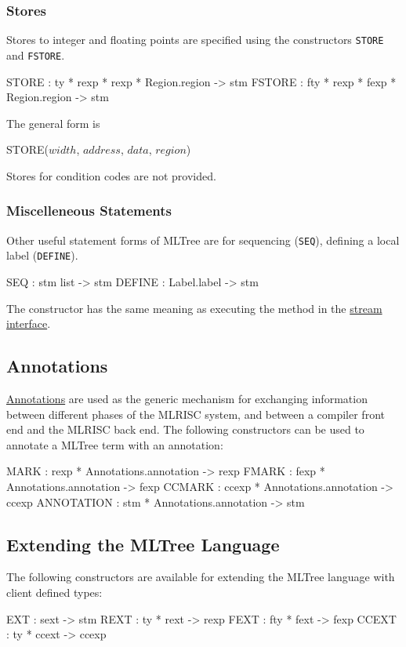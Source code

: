 \subsubsection{Stores}
Stores to integer and floating points are specified using the
constructors \verb|STORE| and \verb|FSTORE|.   
\begin{SML}
   STORE  : ty * rexp * rexp * Region.region -> stm
   FSTORE : fty * rexp * fexp * Region.region -> stm
\end{SML}

The general form is
\begin{SML}
   STORE(\(width\), \(address\), \(data\), \(region\))
\end{SML}

Stores for condition codes are not provided.
\subsubsection{Miscelleneous Statements}

Other useful statement forms of MLTree are for sequencing (\verb|SEQ|),
defining a local label (\verb|DEFINE|).
\begin{SML}
   SEQ    : stm list -> stm
   DEFINE : Label.label -> stm
\end{SML}
The constructor  has the same meaning as 
executing the method  in the 
\href{stream.html}{stream interface}.

\subsection{Annotations}
\href{annotations.html}{Annotations} are used as the generic mechanism for
exchanging information between different phases of the MLRISC system, and
between a compiler front end and the MLRISC back end.
The following constructors can be used to annotate a MLTree term with
an annotation:
\begin{SML}
   MARK : rexp * Annotations.annotation -> rexp
   FMARK : fexp * Annotations.annotation -> fexp
   CCMARK : ccexp * Annotations.annotation -> ccexp 
   ANNOTATION : stm * Annotations.annotation -> stm
\end{SML}

\subsection{Extending the MLTree Language} \label{sec:mltree-extension}

The following constructors are available for extending the MLTree language
with client defined types: 
\begin{SML}
  EXT : sext -> stm
  REXT : ty * rext -> rexp
  FEXT : fty * fext -> fexp
  CCEXT : ty * ccext -> ccexp
\end{SML}

